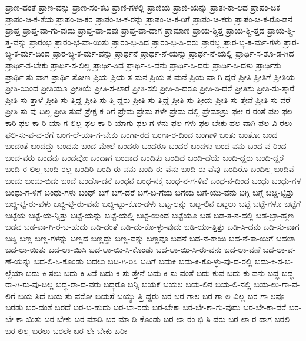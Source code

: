 {ಪ್ರಾಣ-ದಂತೆ
ಪ್ರಾಣ-ವನ್ನು
ಪ್ರಾಣ-ಸಂ-ಕಟ
ಪ್ರಾಣಿ-ಗಳಲ್ಲಿ
ಪ್ರಾಣಿಯ
ಪ್ರಾಣಿ-ಯನ್ನು
ಪ್ರಾತಃ-ಕಾ-ಲದ
ಪ್ರಾಪಂ-ಚಿಕ
ಪ್ರಾಪಂ-ಚಿ-ಕ-ತೆಯ
ಪ್ರಾಪಂ-ಚಿ-ಕರ
ಪ್ರಾಪಂ-ಚಿ-ಕ-ರನ್ನು
ಪ್ರಾಪಂ-ಚಿ-ಕ-ರಿಗೆ
ಪ್ರಾಪಂ-ಚಿ-ಕರು
ಪ್ರಾಪಂ-ಚಿ-ಕ-ರೊ-ಡನೆ
ಪ್ರಾಪ್ತ
ಪ್ರಾಪ್ತ-ವಾ-ಗು-ವುದು
ಪ್ರಾಪ್ತ-ವಾ-ದವು
ಪ್ರಾಪ್ತ-ವಾ-ದಾಗ
ಪ್ರಾಮಾಣಿ
ಪ್ರಾಯ-ಶ್ಚಿತ್ತ
ಪ್ರಾಯ-ಶ್ಚಿ-ತ್ತದ
ಪ್ರಾಯ-ಶ್ಚಿ-ತ್ತ-ವನ್ನು
ಪ್ರಾರಂಭ
ಪ್ರಾರಂ-ಭ-ವಾ-ಯಿತು
ಪ್ರಾರಂ-ಭಿ-ಸಿದ
ಪ್ರಾರಂ-ಭಿ-ಸಿ-ದರು
ಪ್ರಾರಬ್ಧ
ಪ್ರಾರ-ಬ್ಧ-ಕ-ರ್ಮ-ಗಳು
ಪ್ರಾರ-ಬ್ಧ-ಕ-ರ್ಮ-ದಿಂದ
ಪ್ರಾರ-ಬ್ಧ-ಕ-ರ್ಮ-ವನ್ನು
ಪ್ರಾರ್ಥನೆ
ಪ್ರಾರ್ಥ-ನೆ-ಯನ್ನು
ಪ್ರಾರ್ಥ-ನೆ-ಯಲ್ಲಿ
ಪ್ರಾರ್ಥಿ-ಸ-ತೊ-ಡ-ಗಿದ
ಪ್ರಾರ್ಥಿ-ಸ-ಬೇಕು
ಪ್ರಾರ್ಥಿ-ಸ-ಲಿಲ್ಲ
ಪ್ರಾರ್ಥಿ-ಸಿದ
ಪ್ರಾರ್ಥಿ-ಸಿ-ದನು
ಪ್ರಾರ್ಥಿ-ಸಿ-ದರು
ಪ್ರಾರ್ಥಿ-ಸಿ-ದಳು
ಪ್ರಾರ್ಥಿಸು
ಪ್ರಾರ್ಥಿ-ಸು-ವಾಗ
ಪ್ರಾರ್ಥಿ-ಸೋಣ
ಪ್ರಿಯ
ಪ್ರಿಯ-ತ-ಮನ
ಪ್ರಿಯ-ತ-ಮನೆ
ಪ್ರಿಯ-ವಾ-ಗಿ-ದ್ದರೆ
ಪ್ರೀತಿ
ಪ್ರೀತಿಗೆ
ಪ್ರೀತಿಯ
ಪ್ರೀತಿ-ಯಿಂದ
ಪ್ರೀತಿಯೂ
ಪ್ರೀತಿಯೆ
ಪ್ರೀತಿ-ಸ-ಲಾರೆ
ಪ್ರೀತಿ-ಸಲಿ
ಪ್ರೀತಿ-ಸಿ-ದರೂ
ಪ್ರೀತಿ-ಸಿ-ದರೆ
ಪ್ರೀತಿಸು
ಪ್ರೀತಿ-ಸು-ತ್ತಾರೆ
ಪ್ರೀತಿ-ಸು-ತ್ತಾಳೆ
ಪ್ರೀತಿ-ಸು-ತ್ತಿದ್ದ
ಪ್ರೀತಿ-ಸು-ತ್ತಿ-ದ್ದರು
ಪ್ರೀತಿ-ಸು-ತ್ತಿದ್ದೆ
ಪ್ರೀತಿ-ಸು-ತ್ತೀಯ
ಪ್ರೀತಿ-ಸು-ತ್ತೇನೆ
ಪ್ರೀತಿ-ಸು-ವರೆ
ಪ್ರೀತಿ-ಸು-ವು-ದಿಲ್ಲ
ಪ್ರೀತಿ-ಸುವೆ
ಪ್ರೇಕ್ಷ-ಕ-ರಿಗೆ
ಪ್ರೇಮ
ಪ್ರೇಮ-ಗಳೇ
ಪ್ರೇಮ-ದಲ್ಲಿ
ಪ್ರೇಮಾಶ್ರು
ಫಕೀ-ರ-ರಂತೆ
ಫಲ
ಫಲ-ಕಾರಿ
ಫಲ-ಕಾ-ರಿ-ಯಾ-ಗ-ಲಿಲ್ಲ
ಫಲ-ಕಾ-ರಿ-ಯಾಗು
ಫಲ-ಗ-ಳನು
ಫಲ-ಗಳು
ಫಲ-ಬೇಕು
ಫಲ-ವಾಗಿ
ಫಲ-ವಿ-ರಲು
ಫಲಿ-ಸು-ವ-ವ-ರೆಗೆ
ಬಂಗ-ಲೆ-ಯಾ-ಗ-ಬೇಕು
ಬಂಗಾ-ರದ
ಬಂಗಾ-ರ-ದಿಂದ
ಬಂಗಾಳಿ
ಬಂತು
ಬಂತೋ
ಬಂದ
ಬಂದಂತೆ
ಬಂದದ್ದು
ಬಂದನು
ಬಂದ-ಮೇಲೆ
ಬಂದರು
ಬಂದರೂ
ಬಂದರೆ
ಬಂದಳು
ಬಂದ-ವನು
ಬಂದ-ವ-ರಿಂದ
ಬಂದ-ವರು
ಬಂದವು
ಬಂದವೋ
ಬಂದಾಗ
ಬಂದಾದ
ಬಂದಿತು
ಬಂದಿದೆ
ಬಂದಿ-ದೆಯೆ
ಬಂದಿ-ದ್ದರು
ಬಂದಿ-ದ್ದರೆ
ಬಂದಿ-ರ-ಲಿಲ್ಲ
ಬಂದಿ-ರಲ್ಲ
ಬಂದಿರಿ
ಬಂದಿ-ರು-ವನು
ಬಂದಿ-ರು-ವೆನು
ಬಂದಿ-ರು-ವೆವು
ಬಂದಿರೊ
ಬಂದಿಲ್ಲ
ಬಂದಿವೆ
ಬಂದು
ಬಂದು-ಬಿಡು
ಬಂದೆ
ಬಂದೊ-ಡನೆ
ಬಂಧನ
ಬಂಧ-ನಕ್ಕೆ
ಬಂಧ-ನ-ಗ-ಳಿವೆ
ಬಂಧ-ನ-ದಿಂದ
ಬಂಧು
ಬಂಧು-ಗಳ
ಬಂಧು-ಗ-ಳಿಗೆ
ಬಂಧು-ಗಳು
ಬಂಧ್
ಬಗೆ
ಬಗೆ-ದರೆ
ಬಗೆ-ಬ-ಗೆಯ
ಬಗೆಯ
ಬಗೆ-ಯು-ವನು
ಬಗ್ಗಿ
ಬಗ್ಗೆ
ಬಚ್ಚಿ-ಟ್ಟಿತ್ತು
ಬಚ್ಚಿ-ಟ್ಟಿ-ರು-ವಳು
ಬಚ್ಚಿ-ಟ್ಟಿ-ರು-ವೆನು
ಬಚ್ಚಿ-ಟ್ಟು-ಕೊಂ-ಡಳು
ಬಟ್ಟ-ಲನ್ನು
ಬಟ್ಟ-ಲಿನ
ಬಟ್ಟಲು
ಬಟ್ಟೆ
ಬಟ್ಟೆ-ಗಳೂ
ಬಟ್ಟೆಗೆ
ಬಟ್ಟೆಯ
ಬಟ್ಟೆ-ಯ-ನ್ನಿತ್ತು
ಬಟ್ಟೆ-ಯನ್ನು
ಬಟ್ಟೆ-ಯಲ್ಲಿ
ಬಟ್ಟೆ-ಯಿಂದ
ಬಟ್ಟೆಯೂ
ಬಡ
ಬಡ-ತ-ನ-ದಲ್ಲಿ
ಬಡ-ಬ್ರಾ-ಹ್ಮಣ
ಬಡವ
ಬಡ-ವಾ-ಗಿ-ರ-ಬ-ಹುದು
ಬಡಿ-ದಂತೆ
ಬಡಿ-ದು-ಕೊ-ಳ್ಳು-ವುದು
ಬಡಿ-ಯು-ತ್ತಿತ್ತು
ಬಡಿ-ಸಿ-ದನು
ಬಡಿ-ಸು-ವಾಗ
ಬಡ್ಡಿ
ಬಣ್ಣ
ಬಣ್ಣ-ಗಳನ್ನು
ಬಣ್ಣದ
ಬಣ್ಣದ್ದು
ಬಣ್ಣ-ವನ್ನು
ಬಣ್ಣವೂ
ಬದನೆ
ಬದ-ನೆ-ಕಾಯಿ
ಬದ-ನೆ-ಕಾ-ಯಿಗೆ
ಬದಲಾ
ಬದ-ಲಾ-ಯಿತು
ಬದ-ಲಾ-ಯಿಸಿ
ಬದ-ಲಾ-ಯಿ-ಸಿ-ಕೊಂಡು
ಬದ-ಲಾ-ಯಿ-ಸಿ-ರು-ವನು
ಬದ-ಲಾ-ವಣೆ
ಬದ-ಲಾ-ವ-ಣೆ-ಯನ್ನು
ಬದ-ಲಿ-ಸಿ-ಕೊಂಡು
ಬದಲು
ಬದಿ-ಗಿ-ರಿಸಿ
ಬದಿಗೆ
ಬದುಕಿ
ಬದು-ಕಿ-ಕೊ-ಳ್ಳು-ವು-ದ-ರಲ್ಲಿ
ಬದು-ಕಿ-ಸ-ಬ-ಲ್ಲೆಯಾ
ಬದು-ಕಿ-ಸಲು
ಬದು-ಕಿ-ಸಿದೆ
ಬದು-ಕಿ-ಸು-ತ್ತೇನೆ
ಬದು-ಕಿ-ಸು-ವಂತೆ
ಬದು-ಕುವ
ಬದು-ಕು-ವನು
ಬದ್ಧ
ಬದ್ಧ-ರಾ-ಗಿ-ರು-ವು-ದಿಲ್ಲ
ಬದ್ಧ-ರಾ-ದ-ವರು
ಬದ್ಧರೊ
ಬನ್ನಿ
ಬಯಕೆ
ಬಯಲ
ಬಯ-ಲಿನ
ಬಯ-ಲಿ-ನಲ್ಲಿ
ಬಯ-ಲು-ಗಾ-ವ-ಲಿಗೆ
ಬಯ-ಸಿದೆ
ಬಯ-ಸು-ವರೋ
ಬಯಸೆ
ಬಯ್ಯು-ತ್ತಿ-ದ್ದರು
ಬರ
ಬರ-ಗಾಲ
ಬರ-ಗಾ-ಲ-ವಿಲ್ಲ
ಬರ-ಗಾ-ಲವೂ
ಬರಡು
ಬರ-ದಂತೆ
ಬರದೆ
ಬರ-ಬ-ಹುದು
ಬರ-ಬಾ-ರದು
ಬರ-ಬೇಕಾ
ಬರ-ಬೇ-ಕಾ-ಗು-ವುದು
ಬರ-ಬೇ-ಕಾ-ದರೆ
ಬರ-ಬೇ-ಕಾ-ಯಿತು
ಬರ-ಬೇಕು
ಬರ-ಮಾಡಿ
ಬರ-ಮಾ-ಡಿ-ಕೊಂಡು
ಬರ-ಲಾ-ರಂ-ಭಿ-ಸಿ-ದರು
ಬರ-ಲಾ-ರ-ದಾಗ
ಬರಲಿ
ಬರ-ಲಿಲ್ಲ
ಬರಲು
ಬರಲೇ
ಬರ-ಲೇ-ಬೇಕು
ಬರೀ
}
